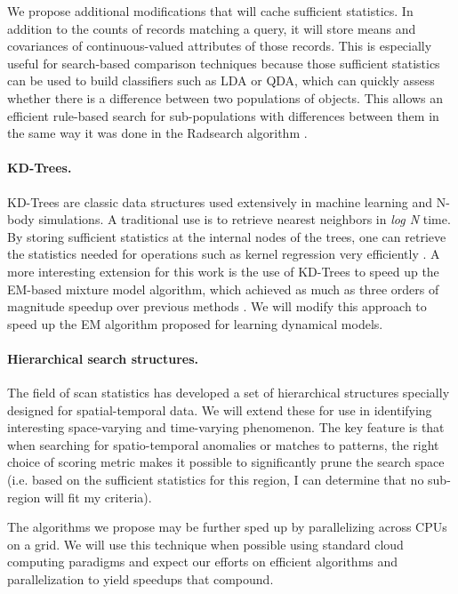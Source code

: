 \documentclass[prd,nofootbib,floatfix,11pt,tightenlines,nofootinbib]{revtex4}
\begin{document}
We propose additional modifications that will cache sufficient
statistics.  In addition to the counts of records matching a query, it will
store means and covariances of continuous-valued attributes of those
records.  This is especially useful for search-based comparison techniques
because those sufficient statistics can be used to build classifiers
such as LDA or QDA, which can quickly assess whether there is a difference
between two populations of objects.  This allows an efficient rule-based
search for sub-populations with differences between them in the same way it
was done in the Radsearch algorithm \cite{Moore02}.

\paragraph{KD-Trees.}
KD-Trees are classic data structures used extensively in
machine learning and N-body simulations.  A traditional use is to retrieve
nearest neighbors in {\it log N} time.  By storing sufficient statistics at
the internal nodes of the trees, one can retrieve the
statistics needed for operations such as kernel regression very efficiently
\cite{Moore97}.  
A more interesting extension for this work is the use of KD-Trees
to speed up the EM-based mixture model algorithm, which achieved as much as
three orders of magnitude speedup over previous methods \cite{Moore99}.  We
will modify this approach to speed up the EM algorithm proposed for
learning dynamical models.

\paragraph{Hierarchical search structures.}  
The field of scan statistics \cite{Kulldorf97,Neill03} has developed a set
of hierarchical structures specially designed for spatial-temporal data.
We will extend these for use in identifying interesting space-varying and
time-varying phenomenon.  The key feature is that when searching for
spatio-temporal anomalies or matches to patterns, the right choice of
scoring metric makes it possible to significantly prune the search space
(i.e. based on the sufficient statistics for this region, I can determine
that no sub-region will fit my criteria).

The algorithms we propose may be further sped up by parallelizing
across CPUs on a grid.  We will use this technique when possible using
standard cloud computing paradigms \cite{gard07} and expect our
efforts on efficient algorithms and parallelization to yield speedups
that compound.
\end{document}
